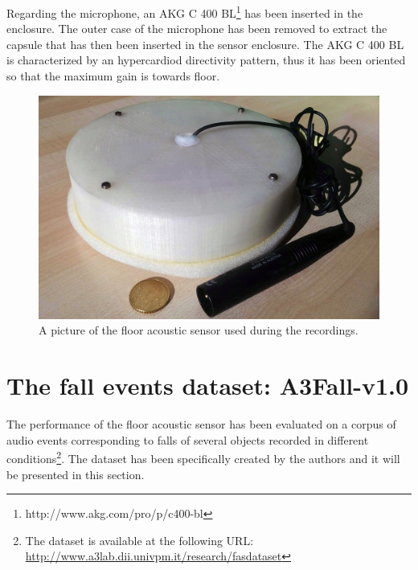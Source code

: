 Regarding the microphone, an AKG C 400 BL\footnote{http://www.akg.com/pro/p/c400-bl} has been inserted in the enclosure. The outer case of the microphone has been removed to extract the capsule that has then been inserted in the sensor enclosure. The AKG C 400 BL is characterized by an hypercardiod directivity pattern, thus it has been oriented so that the maximum gain is towards floor.

\begin{figure}[t]
	\centering
	\includegraphics[width=0.8\columnwidth]{img/FAS_front_little.jpg}
	\caption{A picture of the floor acoustic sensor used during the recordings.} \label{fig:meringa}
\end{figure}

\section{The fall events dataset: A3Fall-v1.0}
\label{sec:dataset}
The performance of the floor acoustic sensor has been evaluated on a corpus of audio events corresponding to falls of several objects recorded in different conditions\footnote{The dataset is available at the following URL: \url{http://www.a3lab.dii.univpm.it/research/fasdataset}}. The dataset has been specifically created by the authors and it will be presented in this section.

